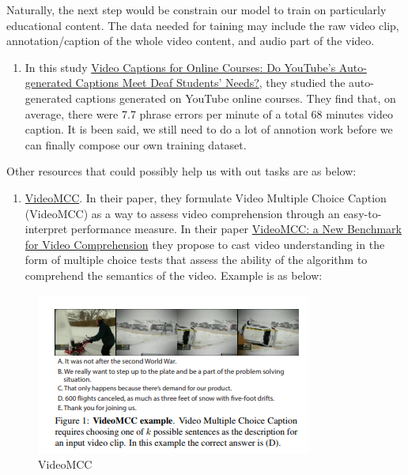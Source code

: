 \documentclass[]{book}
\providecommand{\tightlist}{%
  \setlength{\itemsep}{0pt}\setlength{\parskip}{0pt}}
\theoremstyle{definition}
\theoremstyle{definition}
\theoremstyle{definition}
\theoremstyle{remark}
\begin{document}
Naturally, the next step would be constrain our model to train on
particularly educational content. The data needed for taining may
include the raw video clip, annotation/caption of the whole video
content, and audio part of the video.

\begin{enumerate}
\def\labelenumi{\arabic{enumi}.}
\setcounter{enumi}{1}
\tightlist
\item
  In this study
  \href{http://jofdl.nz/index.php/JOFDL/article/download/255/198}{Video
  Captions for Online Courses: Do YouTube's Auto-generated Captions Meet
  Deaf Students' Needs?}, they studied the auto-generated captions
  generated on YouTube online courses. They find that, on average, there
  were 7.7 phrase errors per minute of a total 68 minutes video caption.
  It is been said, we still need to do a lot of annotion work before we
  can finally compose our own training dataset.
\end{enumerate}

Other resources that could possibly help us with out tasks are as below:

\begin{enumerate}
\def\labelenumi{\arabic{enumi}.}
\setcounter{enumi}{2}
\tightlist
\item
  \href{http://videomcc.org/}{VideoMCC}. In their paper, they formulate
  Video Multiple Choice Caption (VideoMCC) as a way to assess video
  comprehension through an easy-to-interpret performance measure. In
  their paper \href{https://arxiv.org/pdf/1606.07373.pdf}{VideoMCC: a
  New Benchmark for Video Comprehension} they propose to cast video
  understanding in the form of multiple choice tests that assess the
  ability of the algorithm to comprehend the semantics of the video.
  Example is as below:
\end{enumerate}

\begin{figure}
\centering
\includegraphics{img/mcc.png}
\caption{VideoMCC}
\end{figure}
\end{document}
